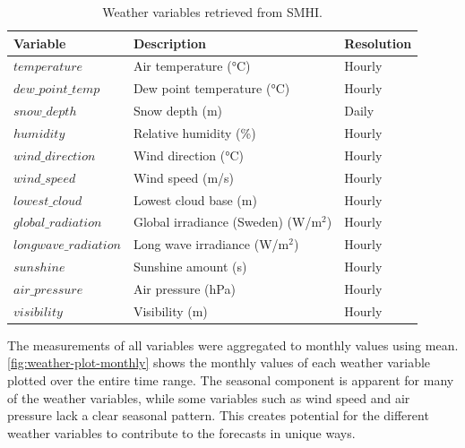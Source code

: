 \begin{table}[h!tbp]%
    \centering
    \caption{Weather variables retrieved from SMHI.}
    \label{tab:weather-variables}
    \small
    \begin{tabularx}{\linewidth}{l l l}
        \textbf{Variable}     & \textbf{Description}                          & \textbf{Resolution} \\
        \midrule
        $temperature$         & Air temperature (\unit{\degreeCelsius})       & Hourly              \\
        $dew\_point\_temp$    & Dew point temperature (\unit{\degreeCelsius}) & Hourly              \\
        $snow\_depth$         & Snow depth (m)                                & Daily               \\
        $humidity$            & Relative humidity (\%)                        & Hourly              \\
        $wind\_direction$     & Wind direction (\unit{\degreeCelsius})        & Hourly              \\
        $wind\_speed$         & Wind speed (m/s)                              & Hourly              \\
        $lowest\_cloud$       & Lowest cloud base (m)                         & Hourly              \\
        $global\_radiation$   & Global irradiance (Sweden) (W/m$^2$)          & Hourly              \\
        $longwave\_radiation$ & Long wave irradiance (W/m$^2$)                & Hourly              \\
        $sunshine$            & Sunshine amount (s)                           & Hourly              \\
        $air\_pressure$       & Air pressure (hPa)                            & Hourly              \\
        $visibility$          & Visibility (m)                                & Hourly              \\
    \end{tabularx}
\end{table}

The measurements of all variables were aggregated to monthly values using mean. \autoref{fig:weather-plot-monthly} shows the monthly values of each weather variable plotted over the entire time range. The seasonal component is apparent for many of the weather variables, while some variables such as wind speed and air pressure lack a clear seasonal pattern. This creates potential for the different weather variables to contribute to the forecasts in unique ways.

